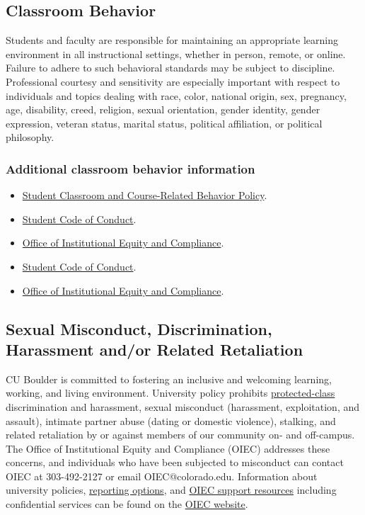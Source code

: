 \subsection*{Classroom Behavior}

Students and faculty are responsible for maintaining an appropriate learning environment in all instructional settings, whether in person, remote, or online. Failure to adhere to such behavioral standards may be subject to discipline. Professional courtesy and sensitivity are especially important with respect to individuals and topics dealing with race, color, national origin, sex, pregnancy, age, disability, creed, religion, sexual orientation, gender identity, gender expression, veteran status, marital status, political affiliation, or political philosophy.

\subsubsection*{Additional classroom behavior information}

\begin{itemize}
    \item \href{https://www.colorado.edu/compliance/policies/student-classroom-course-related-behavior}{Student Classroom and Course-Related Behavior Policy}.
    \item \href{https://www.colorado.edu/sccr/students/honor-code-and-student-code-conduct}{Student Code of Conduct}.
    \item \href{https://www.colorado.edu/oiec/}{Office of Institutional Equity and Compliance}.
    \item \href{https://www.colorado.edu/sccr/students/honor-code-and-student-code-conduct}{Student Code of Conduct}.
    \item \href{https://www.colorado.edu/oiec/}{Office of Institutional Equity and Compliance}.
\end{itemize}

\subsection*{Sexual Misconduct, Discrimination, Harassment and/or Related Retaliation}

CU Boulder is committed to fostering an inclusive and welcoming learning, working, and living environment. University policy prohibits \href{https://www.colorado.edu/oiec/policies/protected-class-nondiscrimination-policy/protected-class-definitions}{protected-class} discrimination and harassment, sexual misconduct (harassment, exploitation, and assault), intimate partner abuse (dating or domestic violence), stalking, and related retaliation by or against members of our community on- and off-campus. The Office of Institutional Equity and Compliance (OIEC) addresses these concerns, and individuals who have been subjected to misconduct can contact OIEC at 303-492-2127 or email OIEC@colorado.edu. Information about university policies, \href{https://www.colorado.edu/oiec/reporting-resolutions/making-report}{reporting options}, and \href{https://www.colorado.edu/oiec/support-resources}{OIEC support resources} including confidential services can be found on the \href{https://www.colorado.edu/oiec/}{OIEC website}.

